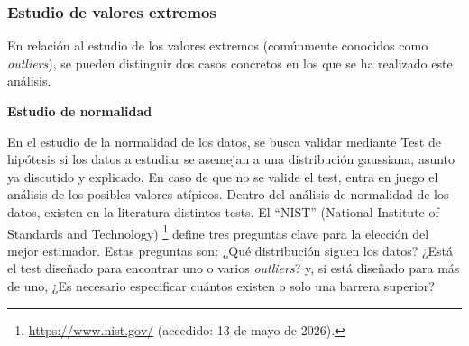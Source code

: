 \subsubsection{Estudio de valores extremos}\label{subsubsec:extreme_case}
En relación al estudio de los valores extremos (comúnmente conocidos como \textit{outliers}), se pueden distinguir
dos casos concretos en los que se ha realizado este análisis.   

\medskip
\noindent\textbf{Estudio de normalidad}

En el estudio de la normalidad de los datos, se busca validar mediante Test de hipótesis si los datos a estudiar
se asemejan a una distribución gaussiana, asunto ya discutido y explicado. En caso de que no se valide el test, 
entra en juego el análisis de los posibles valores atípicos. Dentro del análisis de normalidad de los datos,
existen en la literatura distintos tests. El \enquote{NIST} (National Institute of Standards and Technology)
\footnote{\url{https://www.nist.gov/} (accedido: 13 de mayo de 2026).} define tres preguntas clave para la 
elección del mejor estimador. Estas preguntas son: ¿Qué distribución siguen los datos? ¿Está el test diseñado para
encontrar uno o varios \textit{outliers}? y, si está diseñado para más de uno, ¿Es necesario especificar
cuántos existen o solo una barrera superior?~\cite{nist2012outlier}

